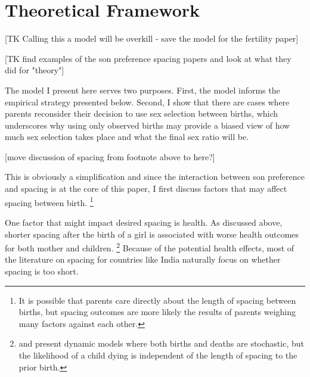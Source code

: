 \documentclass[12pt,letterpaper]{article}
\begin{document}
\section{Theoretical Framework\label{sec:model}}

[TK Calling this a model will be overkill - save the model for the fertility paper]

[TK find examples of the son preference spacing papers and look at what they did
for "theory"]

The model I present here serves two purposes.
First, the model informs the empirical strategy presented below.
Second, I show that there are cases where parents reconsider their decision to 
use sex selection between births, which underscores why 
using only observed births may provide a biased view of how much
sex selection takes place and what the final sex ratio will be.

[move discussion of spacing from footnote above to here?]

This is obviously a simplification and since the interaction
between son preference and spacing is at the core of this paper,
I first discuss factors that may affect spacing between birth.%
\footnote{
It is possible that parents care directly about the
length of spacing between births, but 
spacing outcomes are more likely the results of parents weighing many
factors against each other.
}

One factor that might impact desired spacing is health.
As discussed above, shorter spacing after the birth of a girl is 
associated with worse health outcomes for both mother and children.%
\footnote{
\citet{wolpin84} and \citet{Newman1988} present dynamic models 
where both births and deaths are stochastic, but the likelihood of
a child dying is independent of the length of spacing to
the prior birth.
}
Because of the potential health effects, most of the literature on spacing 
for countries like India naturally focus on whether spacing is too short.
\end{document}
